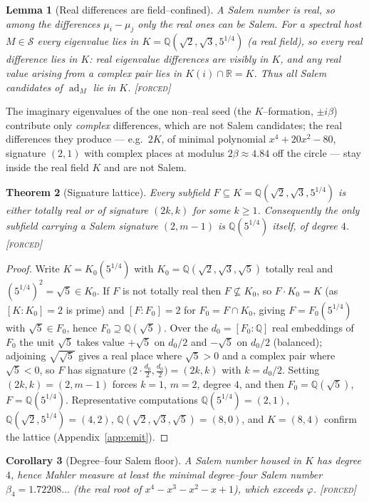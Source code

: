 \documentclass[11pt]{article}
\theoremstyle{plain}
\newtheorem{theorem}{Theorem}[section]
\newtheorem{lemma}[theorem]{Lemma}
\newtheorem{corollary}[theorem]{Corollary}
\theoremstyle{definition}
\theoremstyle{remark}
\newcommand{\forced}{\textcolor{forcedc}{\textsc{[forced]}}}
\newcommand{\R}{\mathbb{R}}
\newcommand{\Q}{\mathbb{Q}}
\newcommand{\Scal}{\mathcal{S}}
\begin{document}
\begin{lemma}[Real differences are field--confined]\label{lem:diffconf}
A Salem number is real, so among the differences $\mu_i-\mu_j$ only the \emph{real} ones can be Salem. For a spectral host $M\in\Scal$ every eigenvalue lies in $K=\Q(\sqrt2,\sqrt3,5^{1/4})$ (a real field), so every real difference lies in $K$: real eigenvalue differences are visibly in $K$, and any real value arising from a complex pair lies in $K(i)\cap\R=K$. Thus all Salem candidates of $\operatorname{ad}_M$ lie in $K$. \forced
\end{lemma}

The imaginary eigenvalues of the one non--real seed (the $K$--formation, $\pm i\beta$) contribute only \emph{complex} differences, which are not Salem candidates; the real differences they produce --- e.g.\ $2K$, of minimal polynomial $x^4+20x^2-80$, signature $(2,1)$ with complex places at modulus $2\beta\approx4.84$ off the circle --- stay inside the real field $K$ and are not Salem.

\begin{theorem}[Signature lattice]\label{thm:siglattice}
Every subfield $F\subseteq K=\Q(\sqrt2,\sqrt3,5^{1/4})$ is either totally real or of signature $(2k,k)$ for some $k\ge1$. Consequently the only subfield carrying a Salem signature $(2,m-1)$ is $\Q(5^{1/4})$ itself, of degree $4$. \forced
\end{theorem}

\begin{proof}
Write $K=K_0(5^{1/4})$ with $K_0=\Q(\sqrt2,\sqrt3,\sqrt5)$ totally real and $(5^{1/4})^2=\sqrt5\in K_0$. If $F$ is not totally real then $F\not\subseteq K_0$, so $F\cdot K_0=K$ (as $[K:K_0]=2$ is prime) and $[F:F_0]=2$ for $F_0=F\cap K_0$, giving $F=F_0(5^{1/4})$ with $\sqrt5\in F_0$, hence $F_0\supseteq\Q(\sqrt5)$. Over the $d_0=[F_0:\Q]$ real embeddings of $F_0$ the unit $\sqrt5$ takes value $+\sqrt5$ on $d_0/2$ and $-\sqrt5$ on $d_0/2$ (balanced); adjoining $\sqrt{\sqrt5}$ gives a real place where $\sqrt5>0$ and a complex pair where $\sqrt5<0$, so $F$ has signature $\big(2\cdot\tfrac{d_0}2,\tfrac{d_0}2\big)=(2k,k)$ with $k=d_0/2$. Setting $(2k,k)=(2,m-1)$ forces $k=1$, $m=2$, degree $4$, and then $F_0=\Q(\sqrt5)$, $F=\Q(5^{1/4})$. Representative computations $\Q(5^{1/4})=(2,1)$, $\Q(\sqrt2,5^{1/4})=(4,2)$, $\Q(\sqrt2,\sqrt3,\sqrt5)=(8,0)$, and $K=(8,4)$ confirm the lattice (Appendix~\ref{app:emit}). \end{proof}

\begin{corollary}[Degree--four Salem floor]\label{cor:deg4}
A Salem number housed in $K$ has degree $4$, hence Mahler measure at least the minimal degree--four Salem number $\beta_4=1.72208\ldots$ (the real root of $x^4-x^3-x^2-x+1$), which exceeds $\varphi$. \forced
\end{corollary}
\end{document}
